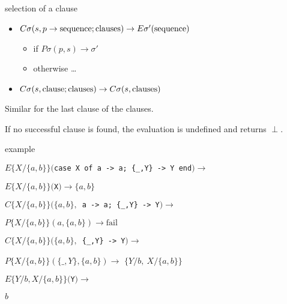 \begin{frame}{selection of a clause}

  \begin{itemize}
     \pause \item $C\sigma(s, p \rightarrow  {\rm sequence} ; {\rm clauses}) \rightarrow E\sigma'({\rm sequence})$ 
     \begin{itemize}      
        \pause\item if $P\sigma(p, s) \rightarrow \sigma'$
        \pause\item otherwise \ldots
     \end{itemize}
     \pause \item $C\sigma(s, {\rm clause} ; {\rm clauses}) \rightarrow C\sigma(s, {\rm clauses})$
  \end{itemize}

Similar for the last clause of the clauses. 

\pause \vspace{20pt}
If no successful clause is found, the evaluation is undefined and returns $\perp$.

\end{frame}
\begin{frame}{example}

\begin{eval}
  \pause$E\lbrace X/\lbrace a,b\rbrace\rbrace(${\tt case X of a -> a; \{\_,Y\} -> Y end}$) \rightarrow$ 
\end{eval}

\begin{eval}
   \hspace{40pt}\pause$E\lbrace X/\lbrace a,b\rbrace\rbrace(${\tt X}$) \rightarrow \lbrace a,b\rbrace$
\end{eval}

\begin{eval}
   \pause $C\lbrace X/\lbrace a,b\rbrace\rbrace(\lbrace a,b\rbrace, ${\tt \ a -> a; \{\_,Y\} -> Y}$) \rightarrow$ 
\end{eval}
\begin{eval}
   \hspace{40pt}\pause $P\lbrace X/\lbrace a,b\rbrace\rbrace( a, \lbrace a,b\rbrace) \rightarrow \mathrm{fail}$
\end{eval}

\begin{eval}
   \pause $C\lbrace X/\lbrace a,b\rbrace\rbrace(\lbrace a,b\rbrace, ${\tt \  \{\_,Y\} -> Y}$) \rightarrow$ 
\end{eval}
\begin{eval}
   \hspace{40pt}\pause $P\lbrace X/\lbrace a,b\rbrace\rbrace(\{\_, Y\}, \lbrace a,b\rbrace) \rightarrow $ \pause $\lbrace Y/b,\  X/\lbrace a,b\rbrace\rbrace$
\end{eval}

\begin{eval}
  \pause$E\lbrace Y/b, X/\lbrace a,b\rbrace\rbrace(${\tt Y}$) \rightarrow $
\end{eval}
\begin{eval}
  \pause$b$
\end{eval}
  
\end{frame}


